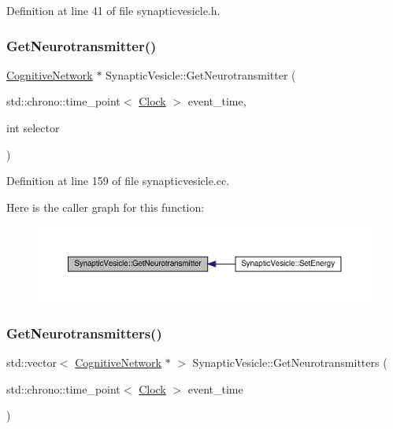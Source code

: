 Definition at line 41 of file synapticvesicle.\+h.

\mbox{\label{class_synaptic_vesicle_a3bdf4423899d438b5a1d2246c52c8c45}} 
\subsubsection{\texorpdfstring{Get\+Neurotransmitter()}{GetNeurotransmitter()}}
{\footnotesize\ttfamily \hyperlink{class_cognitive_network}{Cognitive\+Network} $\ast$ Synaptic\+Vesicle\+::\+Get\+Neurotransmitter (\begin{DoxyParamCaption}\item[{std\+::chrono\+::time\+\_\+point$<$ \hyperlink{universe_8h_a0ef8d951d1ca5ab3cfaf7ab4c7a6fd80}{Clock} $>$}]{event\+\_\+time,  }\item[{int}]{selector }\end{DoxyParamCaption})}



Definition at line 159 of file synapticvesicle.\+cc.

Here is the caller graph for this function\+:\nopagebreak
\begin{figure}[H]
\begin{center}
\leavevmode
\includegraphics[width=350pt]{class_synaptic_vesicle_a3bdf4423899d438b5a1d2246c52c8c45_icgraph}
\end{center}
\end{figure}
\mbox{\label{class_synaptic_vesicle_ada95d85873125115208ff51f60fa72e9}} 
\subsubsection{\texorpdfstring{Get\+Neurotransmitters()}{GetNeurotransmitters()}}
{\footnotesize\ttfamily std\+::vector$<$ \hyperlink{class_cognitive_network}{Cognitive\+Network} $\ast$ $>$ Synaptic\+Vesicle\+::\+Get\+Neurotransmitters (\begin{DoxyParamCaption}\item[{std\+::chrono\+::time\+\_\+point$<$ \hyperlink{universe_8h_a0ef8d951d1ca5ab3cfaf7ab4c7a6fd80}{Clock} $>$}]{event\+\_\+time }\end{DoxyParamCaption})}



